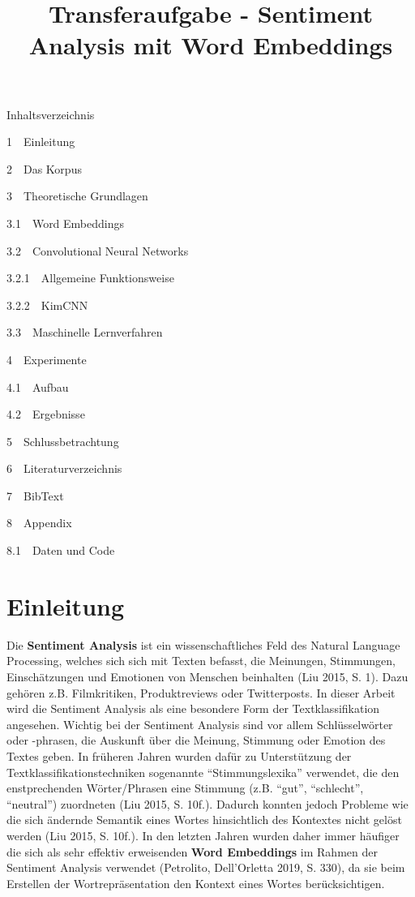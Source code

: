 \documentclass[11pt]{article}
\title{Transferaufgabe - Sentiment Analysis mit Word Embeddings}
\begin{document}
    
    \maketitle
    
    

    
    Inhaltsverzeichnis{}

{{1~~}Einleitung}

{{2~~}Das Korpus}

{{3~~}Theoretische Grundlagen}

{{3.1~~}Word Embeddings}

{{3.2~~}Convolutional Neural Networks}

{{3.2.1~~}Allgemeine Funktionsweise}

{{3.2.2~~}KimCNN}

{{3.3~~}Maschinelle Lernverfahren}

{{4~~}Experimente}

{{4.1~~}Aufbau}

{{4.2~~}Ergebnisse}

{{5~~}Schlussbetrachtung}

{{6~~}Literaturverzeichnis}

{{7~~}BibText}

{{8~~}Appendix}

{{8.1~~}Daten und Code}

    \hypertarget{einleitung}{%
\section{Einleitung}\label{einleitung}}

Die \textbf{Sentiment Analysis} ist ein wissenschaftliches Feld des
Natural Language Processing, welches sich sich mit Texten befasst, die
Meinungen, Stimmungen, Einschätzungen und Emotionen von Menschen
beinhalten (Liu 2015, S. 1). Dazu gehören z.B. Filmkritiken,
Produktreviews oder Twitterposts. In dieser Arbeit wird die Sentiment
Analysis als eine besondere Form der Textklassifikation angesehen.
Wichtig bei der Sentiment Analysis sind vor allem Schlüsselwörter oder
-phrasen, die Auskunft über die Meinung, Stimmung oder Emotion des
Textes geben. In früheren Jahren wurden dafür zu Unterstützung der
Textklassifikationstechniken sogenannte ``Stimmungslexika'' verwendet,
die den enstprechenden Wörter/Phrasen eine Stimmung (z.B. ``gut'',
``schlecht'', ``neutral'') zuordneten (Liu 2015, S. 10f.). Dadurch
konnten jedoch Probleme wie die sich ändernde Semantik eines Wortes
hinsichtlich des Kontextes nicht gelöst werden (Liu 2015, S. 10f.). In
den letzten Jahren wurden daher immer häufiger die sich als sehr
effektiv erweisenden \textbf{Word Embeddings} im Rahmen der Sentiment
Analysis verwendet (Petrolito, Dell'Orletta 2019, S. 330), da sie beim
Erstellen der Wortrepräsentation den Kontext eines Wortes
berücksichtigen.
\end{document}
